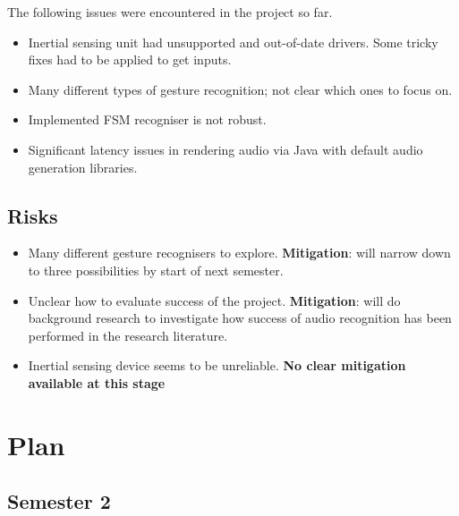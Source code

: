 \documentclass[11pt]{article}
\begin{document}
The following issues were encountered in the project so far.
\begin{itemize}
    \tightlist
\item Inertial sensing unit had unsupported and out-of-date drivers. Some tricky
fixes had to be applied to get inputs.
\item Many different types of gesture recognition; not clear which ones to focus
on.
\item Implemented FSM recogniser is not robust.
\item Significant latency issues in rendering audio via Java with default audio
generation libraries.
\end{itemize}

\subsection{Risks}\label{risks}

\begin{itemize}
\tightlist
\item   Many different gesture recognisers to explore. \textbf{Mitigation}: will narrow
down to three possibilities by start of next semester.
\item Unclear how to evaluate success of the project. \textbf{Mitigation}: will do
background research to investigate how success of audio recognition has
been performed in the research literature.
\item Inertial sensing device seems to be unreliable. \textbf{No clear mitigation available at this stage}
\end{itemize}
    
\section{Plan}\label{plan}

\subsection{Semester 2}
\end{document}
